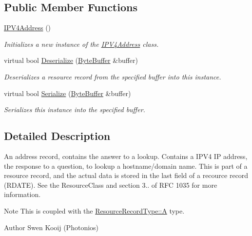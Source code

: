 \subsection*{Public Member Functions}
\begin{DoxyCompactItemize}
\item 
\hyperlink{class_senergy_1_1_dns_1_1_records_1_1_i_p_v4_address_a9299fdb8bd0809dba6efbc1e28cec068}{I\-P\-V4\-Address} ()
\begin{DoxyCompactList}\small\item\em Initializes a new instance of the \hyperlink{class_senergy_1_1_dns_1_1_records_1_1_i_p_v4_address}{I\-P\-V4\-Address} class. \end{DoxyCompactList}\item 
virtual bool \hyperlink{class_senergy_1_1_dns_1_1_records_1_1_i_p_v4_address_a8de88ac0b61886638f63dd4930b07b36}{Deserialize} (\hyperlink{class_senergy_1_1_byte_buffer}{Byte\-Buffer} \&buffer)
\begin{DoxyCompactList}\small\item\em Deserializes a resource record from the specified buffer into this instance. \end{DoxyCompactList}\item 
virtual bool \hyperlink{class_senergy_1_1_dns_1_1_records_1_1_i_p_v4_address_ab080902a8a40e1933d327ff95298a996}{Serialize} (\hyperlink{class_senergy_1_1_byte_buffer}{Byte\-Buffer} \&buffer)
\begin{DoxyCompactList}\small\item\em Serializes this instance into the specified buffer. \end{DoxyCompactList}\end{DoxyCompactItemize}


\subsection{Detailed Description}
An address record, contains the answer to a lookup. Contains a I\-P\-V4 I\-P address, the response to a question, to lookup a hostname/domain name. This is part of a resource record, and the actual data is stored in the last field of a recource record (R\-D\-A\-T\-E). See the Resource\-Class and section 3.. of R\-F\-C 1035 for more information. 

\begin{DoxyNote}{Note}
This is coupled with the \hyperlink{namespace_senergy_1_1_dns_a590bfd748c955364770f5ce358d9dfe0a7fc56270e7a70fa81a5935b72eacbe29}{Resource\-Record\-Type\-::\-A} type.
\end{DoxyNote}
\begin{DoxyAuthor}{Author}
Swen Kooij (Photonios) 
\end{DoxyAuthor}


